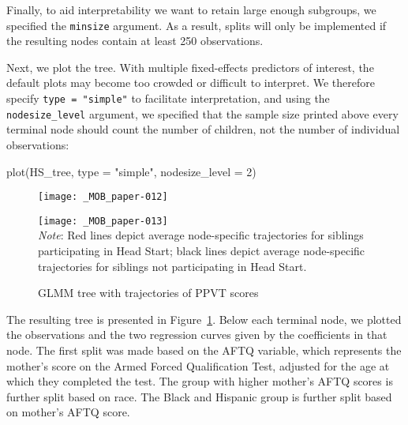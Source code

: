 \documentclass[doc,floatsintext,natbib]{apa7}
\begin{document}

Finally, to aid interpretability we want to retain large enough subgroups, we specified the \texttt{minsize} argument. As a result, splits will only be implemented if the resulting nodes contain at least 250 observations.

Next, we plot the tree. With multiple fixed-effects predictors of interest, the default plots may become too crowded or difficult to interpret. We therefore specify \verb|type = "simple"| to facilitate interpretation, and using the \verb|nodesize_level| argument, we specified that the sample size printed above every terminal node should count the number of children, not the number of individual observations:

\begin{Schunk}
\begin{Sinput}
 plot(HS_tree, type = "simple", nodesize_level = 2)
\end{Sinput}
\end{Schunk}

\begin{figure}%
\caption{GLMM tree with trajectories of PPVT scores}
\texttt{[image: \_MOB\_paper-012]}

\vspace*{-3cm}

\texttt{[image: \_MOB\_paper-013]}
\\\textit{Note}: Red lines depict average node-specific trajectories for siblings participating in Head Start; black lines depict average node-specific trajectories for siblings not participating in Head Start.
\label{fig:lmm_tree}
\end{figure}%


The resulting tree is presented in Figure~\ref{fig:lmm_tree}. Below each terminal node, we plotted the observations and the two regression curves given by the coefficients in that node. The first split was made based on the AFTQ variable, which represents the mother's score on the Armed Forced Qualification Test, adjusted for the age at which they completed the test. The group with higher mother's AFTQ scores is further split based on race. The Black and Hispanic group is further split based on mother's AFTQ score. 
\end{document}
